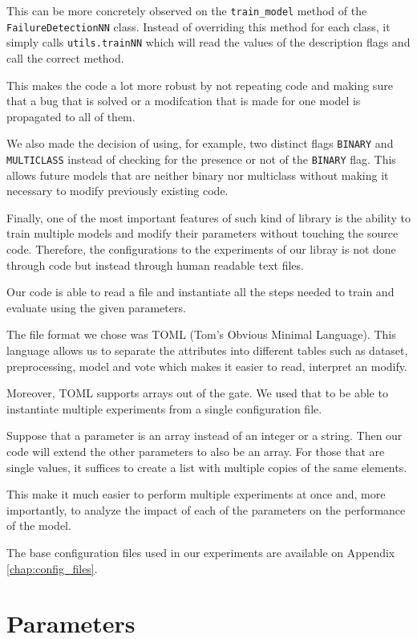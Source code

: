This can be more concretely observed on the \verb|train_model| method of the \\ \verb|FailureDetectionNN| class.
Instead of overriding this method for each class, it simply calls \verb|utils.trainNN| which will read the values of the description flags and call the correct method.

This makes the code a lot more robust by not repeating code and making sure that a bug that is solved or a modifcation that is made for one model is propagated to all of them.

We also made the decision of using, for example, two distinct flags \verb|BINARY| and \\ \verb|MULTICLASS| instead of checking for the presence or not of the \verb|BINARY| flag.
This allows future models that are neither binary nor multiclass without making it necessary to modify previously existing code.

Finally, one of the most important features of such kind of library is the ability to train multiple models and modify their parameters without touching the source code.
Therefore, the configurations to the experiments of our libray is not done through code but instead through human readable text files.

Our code is able to read a file and instantiate all the steps needed to train and evaluate using the given parameters.

The file format we chose was TOML (Tom's Obvious Minimal Language).
This language allows us to separate the attributes into different tables such as dataset, preprocessing, model and vote which makes it easier to read, interpret an modify.

Moreover, TOML supports arrays out of the gate.
We used that to be able to instantiate multiple experiments from a single configuration file.

Suppose that a parameter is an array instead of an integer or a string.
Then our code will extend the other parameters to also be an array.
For those that are single values, it suffices to create a list with multiple copies of the same elements.

This make it much easier to perform multiple experiments at once and, more importantly, to analyze the impact of each of the parameters on the performance of the model.

The base configuration files used in our experiments are available on Appendix \ref{chap:config_files}.

\section{Parameters}

